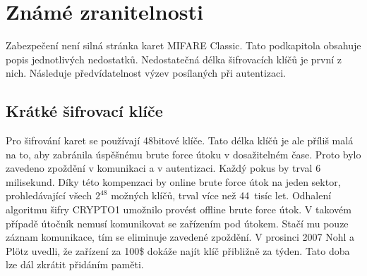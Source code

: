 \chapter{Známé zranitelnosti}
\label{zranitelnosti}
Zabezpečení není silná stránka karet MIFARE Classic. Tato podkapitola obsahuje popis jednotlivých nedostatků. Nedostatečná délka šifrovacích klíčů je první z nich. Následuje předvídatelnost výzev posílaných při autentizaci.
\par
\section{Krátké šifrovací klíče}
Pro šifrování karet se používají 48bitové klíče. Tato délka klíčů je ale příliš malá na to, aby zabránila úspěšnému brute force útoku v dosažitelném čase. Proto bylo zavedeno zpoždění v komunikaci a v autentizaci. Každý pokus by trval 6 milisekund. Díky této kompenzaci by online brute force útok na jeden sektor, prohledávající všech $2^{48}$ možných klíčů, trval více než 44~tisíc let. Odhalení algoritmu šifry CRYPTO1 umožnilo provést offline brute force útok. V takovém případě útočník nemusí komunikovat se zařízením pod útokem. Stačí mu pouze záznam komunikace, tím se eliminuje zavedené zpoždění. V prosinci 2007 Nohl a Plötz uvedli, že zařízení za 100\$ dokáže najít klíč přibližně za týden. Tato doba lze dál zkrátit přidáním paměti\cite{Cryptanalisis}.
\par
